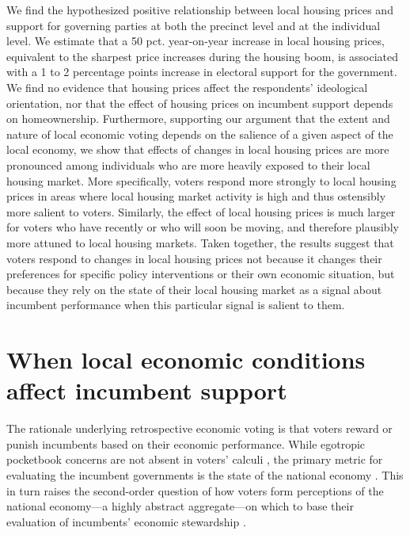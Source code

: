 \documentclass[12pt,a4paper]{article}
\begin{document}
	We find the hypothesized positive relationship between local housing prices and support for governing parties at both the precinct level and at the individual level. We estimate that a 50 pct. year-on-year increase in local housing prices, equivalent to the sharpest price increases during the housing boom, is associated with a 1 to 2 percentage points increase in electoral support for the government. We find no evidence that housing prices affect the respondents’ ideological orientation, nor that the effect of housing prices on incumbent support depends on homeownership. Furthermore, supporting our argument that the extent and nature of local economic voting depends on the salience of a given aspect of the local economy, we show that effects of changes in local housing prices are more pronounced among individuals who are more heavily exposed to their local housing market. More specifically, voters respond more strongly to local housing prices in areas where local housing market activity is high and thus ostensibly more salient to voters. Similarly, the effect of local housing prices is much larger for voters who have recently or who will soon be moving, and therefore plausibly more attuned to local housing markets. Taken together, the results suggest that voters respond to changes in local housing prices not because it changes their preferences for specific policy interventions or their own economic situation, but because they rely on the state of their local housing market as a signal about incumbent performance when this particular signal is salient to them.
	
	\section{When local economic conditions affect incumbent support}
	The rationale underlying retrospective economic voting is that voters reward or punish incumbents based on their economic performance. While egotropic pocketbook concerns are not absent in voters’ calculi \citep{healy2017digging, tilley2017pound}, the primary metric for evaluating the incumbent governments is the state of the national economy \citep{kinder1979economic,lewis2013vp}. This in turn raises the second-order question of how voters form perceptions of the national economy—a highly abstract aggregate—on which to base their evaluation of incumbents’ economic stewardship \citep{reeves2012ecologies}. 
	
\end{document}
